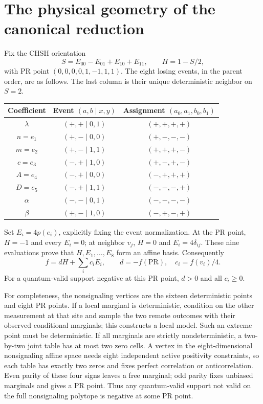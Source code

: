 \section{The physical geometry of the canonical reduction}\label{sec:physical}
Fix the CHSH orientation
\[S=E_{00}-E_{01}+E_{10}+E_{11},\qquad H=1-S/2,\]
with PR point $(0,0,0,0,1,-1,1,1)$. The eight losing events, in the parent order, are as follows. The last column is their unique deterministic neighbor on $S=2$.
\begin{center}\small
\begin{tabular}{ccc}\toprule
Coefficient & Event $(a,b\mid x,y)$ & Assignment $(a_0,a_1,b_0,b_1)$\\\midrule
$\lambda$ & $(+,+\mid0,1)$ & $(+,+,+,+)$\\
$n=e_1$ & $(+,-\mid0,0)$ & $(+,-,-,-)$\\
$m=e_2$ & $(+,-\mid1,1)$ & $(+,+,+,-)$\\
$c=e_3$ & $(-,+\mid1,0)$ & $(+,-,+,-)$\\
$A=e_4$ & $(-,+\mid0,0)$ & $(-,+,+,+)$\\
$D=e_5$ & $(-,+\mid1,1)$ & $(-,-,-,+)$\\
$\alpha$ & $(-,-\mid0,1)$ & $(-,-,-,-)$\\
$\beta$ & $(+,-\mid1,0)$ & $(-,+,-,+)$\\\bottomrule
\end{tabular}\end{center}
Set $E_i=4p(e_i)$, explicitly fixing the event normalization. At the PR point, $H=-1$ and every $E_i=0$; at neighbor $v_j$, $H=0$ and $E_i=4\delta_{ij}$. These nine evaluations prove that $H,E_1,\ldots,E_8$ form an affine basis. Consequently
\[
f=dH+\sum_i c_iE_i,\qquad d=-f(\mathrm{PR}),\quad c_i=f(v_i)/4.
\]
For a quantum-valid support negative at this PR point, $d>0$ and all $c_i\ge0$.

For completeness, the nonsignaling vertices are the sixteen deterministic points and eight PR points. If a local marginal is deterministic, condition on the other measurement at that site and sample the two remote outcomes with their observed conditional marginals; this constructs a local model. Such an extreme point must be deterministic. If all marginals are strictly nondeterministic, a two-by-two joint table has at most two zero cells. A vertex in the eight-dimensional nonsignaling affine space needs eight independent active positivity constraints, so each table has exactly two zeros and fixes perfect correlation or anticorrelation. Even parity of these four signs leaves a free marginal; odd parity fixes unbiased marginals and gives a PR point. Thus any quantum-valid support not valid on the full nonsignaling polytope is negative at some PR point.

